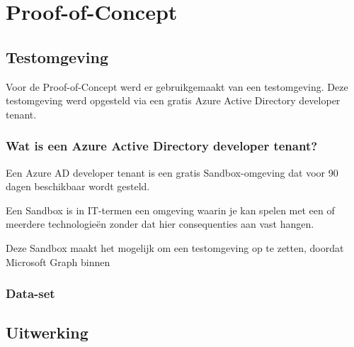 
\chapter{Proof-of-Concept}%
\label{ch:poc}

\section{Testomgeving}

Voor de Proof-of-Concept werd er gebruikgemaakt van een testomgeving. Deze testomgeving werd opgesteld via een gratis Azure Active Directory developer tenant. 

\subsection{Wat is een Azure Active Directory developer tenant?}

Een Azure \ac{AD} developer tenant is een gratis Sandbox-omgeving dat voor 90 dagen beschikbaar wordt gesteld. 

Een Sandbox is in IT-termen een omgeving waarin je kan spelen met een of meerdere technologieën zonder dat hier consequenties aan vast hangen.  

Deze Sandbox maakt het mogelijk om een testomgeving op te zetten, doordat Microsoft Graph binnen 

\subsection{Data-set}




\section{Uitwerking}

